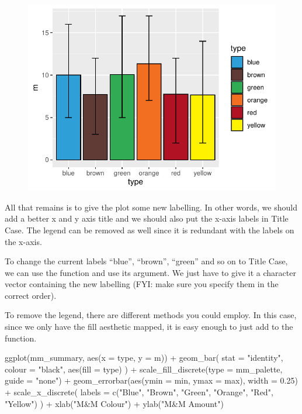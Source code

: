 \begin{figure}[H]
\includegraphics[scale = .75]{graphics/ch3Figs/bar_3.pdf}
\end{figure}

All that remains is to give the plot some new labelling. In other words, we should add a better x and y axis title and we should also put the x-axis labels in Title Case. The legend can be removed as well since it is redundant with the labels on the x-axis.

To change the current labels ``blue'', ``brown'', ``green'' and so on to Title Case, we can use the function  and use its  argument. We just have to give it a character vector containing the new labelling (FYI: make sure you specify them in the correct order).

To remove the legend, there are different methods you could employ. In this case, since we only have the fill aesthetic mapped, it is easy enough to just add  to the  function.

\begin{inR}
ggplot(mm_summary, aes(x = type, y = m)) +
  geom_bar(
    stat = "identity",
    colour = "black",
    aes(fill = type)
  ) +
  scale_fill_discrete(type = mm_palette, guide = "none") +
  geom_errorbar(aes(ymin = min, ymax = max), width = 0.25) +
  scale_x_discrete(
    labels = c("Blue", "Brown", "Green", "Orange", "Red", "Yellow")
  ) +
  xlab("M&M Colour") +
  ylab("M&M Amount")
\end{inR}

\vspace{2em}

